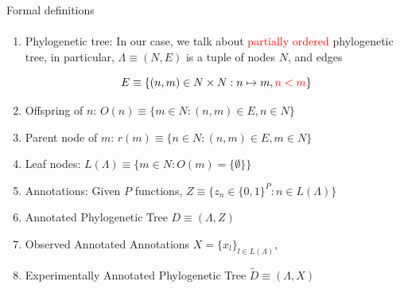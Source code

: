 \documentclass[9pt,ignorenonframetext,]{beamer}
\newcommand{\phylo}{\Lambda{}} %
\newcommand{\aphylo}{D{}}      %
\newcommand{\aphyloObs}{\tilde \aphylo{}} %
\newcommand{\Ann}{Z{}} %
\newcommand{\ann}{z{}} %
\newcommand{\AnnObs}{X{}}
\newcommand{\annObs}{x{}}
\newcommand{\Leaf}{L{}}
\begin{document}
\begin{frame}{}

\begin{center}
\Huge
{}
\end{center}

\maketitle

\appendix

\end{frame}

\begin{frame}[t,label=formaldef]{Formal definitions}

\framesubtitle{\hyperlink{definitions}{}}

\begin{enumerate}
\def\labelenumi{\arabic{enumi}.}
\item
  Phylogenetic tree: In our case, we talk about
  \textcolor{red}{partially ordered} phylogenetic tree, in particular,
  \(\phylo\equiv (N,E)\) is a tuple of nodes \(N\), and edges

  \[
  E\equiv \{(n, m) \in N\times N: n\mapsto m, \textcolor{red}{n < m}\}
  \]
\item
  Offspring of \(n\): \(O(n)\equiv\{m\in N: (n, m) \in E, n\in N\}\)
\item
  Parent node of \(m\): \(r(m) \equiv\{n \in N: (n, m) \in E, m\in N\}\)
\item
  Leaf nodes: \(\Leaf(\phylo)\equiv \{m \in N: O(m)=\{\emptyset\}\}\)
\item
  Annotations: Given \(P\) functions,
  \(\Ann \equiv \{\ann_n \in \{0,1\}^P: n\in \Leaf(\phylo)\}\)
\item
  Annotated Phylogenetic Tree \(\aphylo \equiv(\phylo, \Ann)\)
\item
  Observed Annotated Annotations
  \(\AnnObs = \{\annObs_l\}_{l\in \Leaf(\phylo)}\),
\item
  Experimentally Annotated Phylogenetic Tree
  \(\aphyloObs\equiv(\phylo, \AnnObs)\)
\end{enumerate}

\end{frame}
\end{document}
